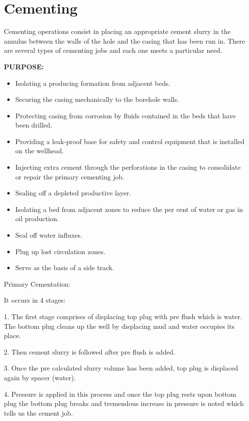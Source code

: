 \chapter{Cementing}
	
Cementing operations consist in placing an appropriate cement slurry in 
the annulus between the walls of the hole and the casing that has been run in.
There are several types of cementing jobs and each one meets a particular need.

\vspace{1em}

\textbf{PURPOSE:}

\begin{itemize}

\item Isolating a producing formation from adjacent beds.  
\item Securing the casing mechanically to the borehole walls.
\item Protecting casing from corrosion by fluids contained in the beds that have been drilled.
\item Providing a leak-proof base for safety and control equipment that is installed on the wellhead.
\item Injecting extra cement through the perforations in the casing to consolidate or repair the primary cementing job.
\item Sealing off a depleted productive layer.
\item Isolating a bed from adjacent zones to reduce the per cent of water or gas in oil production.
\item Seal off water influxes.
\item Plug up lost circulation zones.
\item Serve as the basis of a side track.

\end{itemize}


Primary Cementation:

It occurs in 4 stages:

1. The first stage comprises of displacing top plug with pre flush
which is water. The bottom plug cleans up the well by
displacing mud and water occupies its place.

2. Then cement slurry is followed after pre flush is added.

3. Once the pre calculated slurry volume has been added, top plug
is displaced again by spacer (water).

4. Pressure is applied in this process and once the top plug rests
upon bottom plug the bottom plug breaks and tremendous
increase in pressure is noted which tells us the cement job.

